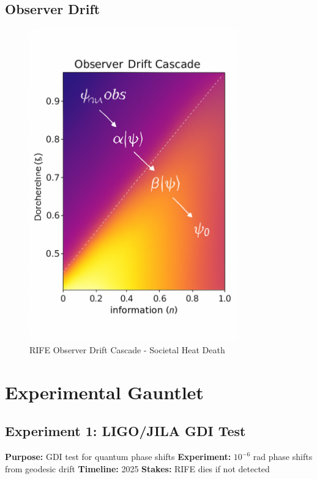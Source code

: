 \documentclass[11pt]{report}
\newcommand{\tenminus}{$10^{-6}$}
\begin{document}
\subsection{Observer Drift}
\begin{figure}[ht]
  \centering
  \includegraphics[width=0.8\textwidth]{simulations/observer_drift.png}
  \caption{RIFE Observer Drift Cascade - Societal Heat Death}
\end{figure}

\section{Experimental Gauntlet}

\subsection{Experiment 1: LIGO/JILA GDI Test}
\textbf{Purpose:} GDI test for quantum phase shifts
\textbf{Experiment:} \tenminus{} rad phase shifts from geodesic drift
\textbf{Timeline:} 2025
\textbf{Stakes:} RIFE dies if not detected
\end{document}
